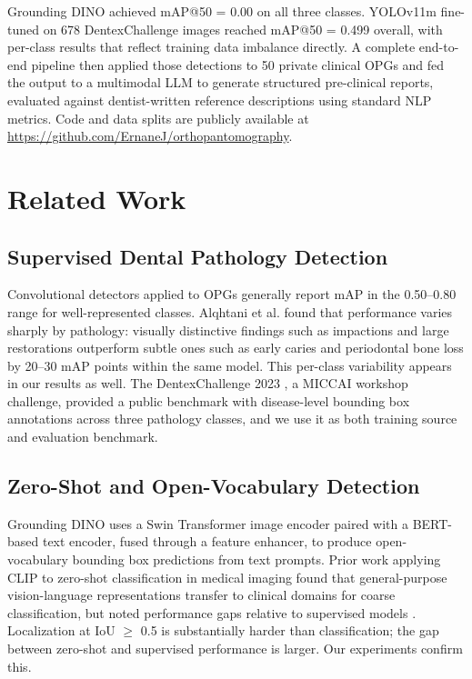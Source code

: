 \documentclass[conference]{IEEEtran}
\begin{document}
Grounding DINO achieved mAP@50 = 0.00 on all three classes. YOLOv11m fine-tuned on 678 DentexChallenge images reached mAP@50 = 0.499 overall, with per-class results that reflect training data imbalance directly. A complete end-to-end pipeline then applied those detections to 50 private clinical OPGs and fed the output to a multimodal LLM to generate structured pre-clinical reports, evaluated against dentist-written reference descriptions using standard NLP metrics. Code and data splits are publicly available at \url{https://github.com/ErnaneJ/orthopantomography}.

\section{Related Work}

\subsection{Supervised Dental Pathology Detection}

Convolutional detectors applied to OPGs generally report mAP in the 0.50--0.80 range for well-represented classes. Alqhtani et al. \cite{alqhtani2025} found that performance varies sharply by pathology: visually distinctive findings such as impactions and large restorations outperform subtle ones such as early caries and periodontal bone loss by 20--30 mAP points within the same model. This per-class variability appears in our results as well. The DentexChallenge 2023 \cite{dentex2023}, a MICCAI workshop challenge, provided a public benchmark with disease-level bounding box annotations across three pathology classes, and we use it as both training source and evaluation benchmark.

\subsection{Zero-Shot and Open-Vocabulary Detection}

Grounding DINO \cite{liu2024gdino} uses a Swin Transformer image encoder paired with a BERT-based text encoder, fused through a feature enhancer, to produce open-vocabulary bounding box predictions from text prompts. Prior work applying CLIP \cite{radford2021} to zero-shot classification in medical imaging found that general-purpose vision-language representations transfer to clinical domains for coarse classification, but noted performance gaps relative to supervised models \cite{zhang2024clip}. Localization at IoU $\geq$ 0.5 is substantially harder than classification; the gap between zero-shot and supervised performance is larger. Our experiments confirm this.
\end{document}
